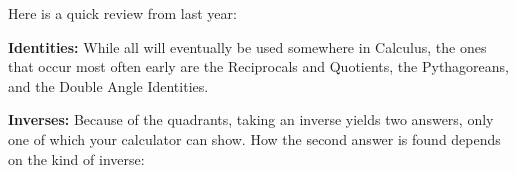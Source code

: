 Here is a quick review from last year: \par

\textbf{Identities: } While all will eventually be used somewhere in Calculus, the ones that occur most often early are the Reciprocals and Quotients, the Pythagoreans, and the Double Angle Identities. 

\begin{center}
\end{center}

\textbf{Inverses: } Because of the quadrants, taking an inverse yields two answers, only one of which your calculator can show.  How the second answer is found depends on the kind of inverse: 

\begin{center}
\end{center}

